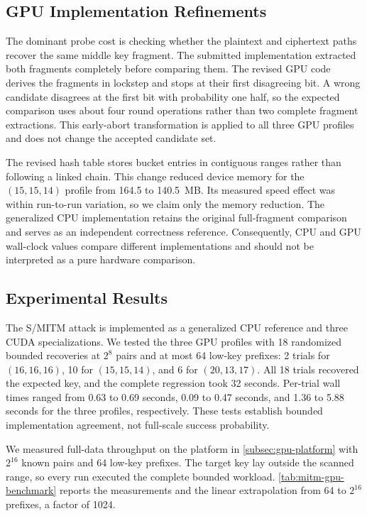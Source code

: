 \documentclass[version=preprint]{iacrcc}
\begin{document}
\subsection{GPU Implementation Refinements}

The dominant probe cost is checking whether the plaintext and ciphertext paths recover the same middle key fragment.
The submitted implementation extracted both fragments completely before comparing them.
The revised GPU code derives the fragments in lockstep and stops at their first disagreeing bit.
A wrong candidate disagrees at the first bit with probability one half, so the expected comparison uses about four round operations rather than two complete fragment extractions.
This early-abort transformation is applied to all three GPU profiles and does not change the accepted candidate set.

The revised hash table stores bucket entries in contiguous ranges rather than following a linked chain.
This change reduced device memory for the $(15,15,14)$ profile from 164.5 to 140.5~MB.
Its measured speed effect was within run-to-run variation, so we claim only the memory reduction.
The generalized CPU implementation retains the original full-fragment comparison and serves as an independent correctness reference.
Consequently, CPU and GPU wall-clock values compare different implementations and should not be interpreted as a pure hardware comparison.

\subsection{Experimental Results}\label{sec:mitm-experimental}

The S/MITM attack is implemented as a generalized CPU reference and three CUDA specializations.
We tested the three GPU profiles with 18 randomized bounded recoveries at $2^8$ pairs and at most 64 low-key prefixes: 2 trials for $(16,16,16)$, 10 for $(15,15,14)$, and 6 for $(20,13,17)$.
All 18 trials recovered the expected key, and the complete regression took 32 seconds.
Per-trial wall times ranged from 0.63 to 0.69 seconds, 0.09 to 0.47 seconds, and 1.36 to 5.88 seconds for the three profiles, respectively.
These tests establish bounded implementation agreement, not full-scale success probability.

We measured full-data throughput on the platform in \autoref{subsec:gpu-platform} with $2^{16}$ known pairs and 64 low-key prefixes.
The target key lay outside the scanned range, so every run executed the complete bounded workload.
\autoref{tab:mitm-gpu-benchmark} reports the measurements and the linear extrapolation from 64 to $2^{16}$ prefixes, a factor of 1024.
\end{document}
